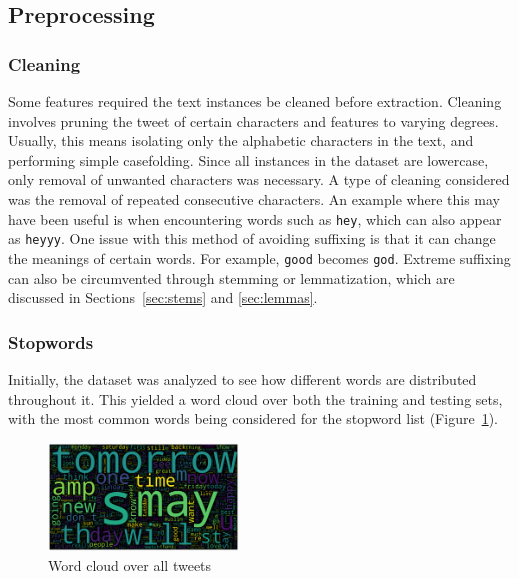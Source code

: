 \documentclass[11pt]{article}
\begin{document}
\subsection{Preprocessing}

\subsubsection{Cleaning}
Some features required the text instances be cleaned before extraction.
Cleaning involves pruning the tweet of certain characters and features to varying degrees.
Usually, this means isolating only the alphabetic characters in the text, and performing simple casefolding.
Since all instances in the dataset are lowercase, only removal of unwanted characters was necessary.
A type of cleaning considered was the removal of repeated consecutive characters.
An example where this may have been useful is when encountering words such as \texttt{hey}, which can also appear as \texttt{heyyy}.
One issue with this method of avoiding suffixing is that it can change the meanings of certain words. For example, \texttt{good} becomes \texttt{god}.
Extreme suffixing can also be circumvented through stemming or lemmatization, which are discussed in Sections~\ref{sec:stems} and \ref{sec:lemmas}.


\subsubsection{Stopwords}

Initially, the dataset was analyzed to see how different words are distributed throughout it.
This yielded a word cloud over both the training and testing sets, with the most common words being considered for the stopword list (Figure~\ref{fig:wc-all}).

\begin{figure}[!h]
	\centering
	\includegraphics[width = 0.45\textwidth]{wc-all-clean-default.png}
	\caption{Word cloud over all tweets}
	\label{fig:wc-all}
\end{figure} 
\end{document}
